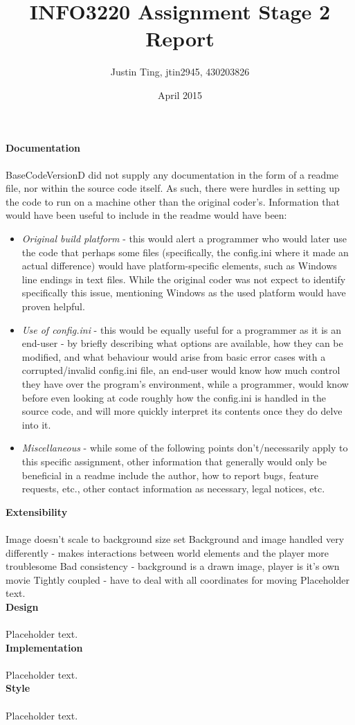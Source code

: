 \documentclass[12pt]{article}
\title{INFO3220 Assignment Stage 2 Report}
\author{Justin Ting, jtin2945, 430203826}
\date{April 2015}
\begin{document}
\maketitle

\textbf{Documentation}\\\\
BaseCodeVersionD did not supply any documentation in the form of a readme file, nor within the source code itself. As such, there were hurdles in setting up the code to run on a machine other than the original coder's. Information that would have been useful to include in the readme would have been:\\
\begin{itemize}
\item \textit{Original build platform} - this would alert a programmer who would later use the code that perhaps some files (specifically, the config.ini where it made an actual difference) would have platform-specific elements, such as Windows line endings in text files. While the original coder was not expect to identify specifically this issue, mentioning Windows as the used platform would have proven helpful.
\item \textit{Use of config.ini} - this would be equally useful for a programmer as it is an end-user - by briefly describing what options are available, how they can be modified, and what behaviour would arise from basic error cases with a corrupted/invalid config.ini file, an end-user would know how much control they have over the program's environment, while a programmer, would know before even looking at code roughly how the config.ini is handled in the source code, and will more quickly interpret its contents once they do delve into it.
\item \textit{Miscellaneous} - while some of the following points don't/necessarily apply to this specific assignment, other information that generally would only be beneficial in a readme include the author, how to report bugs, feature requests, etc., other contact information as necessary, legal notices, etc.
\end{itemize}

\textbf{Extensibility}\\\\
        Image doesn't scale to background size set
        Background and image handled very differently - makes interactions between world elements and the player more troublesome
        Bad consistency - background is a drawn image, player is it's own movie
        Tightly coupled - have to deal with all coordinates for moving
Placeholder text.\\

\textbf{Design}\\\\
Placeholder text.\\

\textbf{Implementation}\\\\
Placeholder text.\\

\textbf{Style}\\\\
Placeholder text.\\
\end{document}
